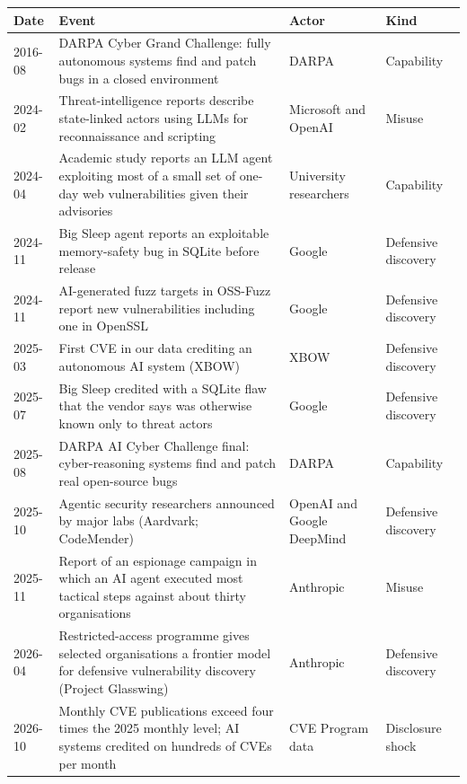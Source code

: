 \begin{tabular}{p{}p{}p{}p{}}
\toprule
Date & Event & Actor & Kind \\
\midrule
2016-08 & DARPA Cyber Grand Challenge: fully autonomous systems find and patch bugs in a closed environment & DARPA & Capability \\
2024-02 & Threat-intelligence reports describe state-linked actors using LLMs for reconnaissance and scripting & Microsoft and OpenAI & Misuse \\
2024-04 & Academic study reports an LLM agent exploiting most of a small set of one-day web vulnerabilities given their advisories & University researchers & Capability \\
2024-11 & Big Sleep agent reports an exploitable memory-safety bug in SQLite before release & Google & Defensive discovery \\
2024-11 & AI-generated fuzz targets in OSS-Fuzz report new vulnerabilities including one in OpenSSL & Google & Defensive discovery \\
2025-03 & First CVE in our data crediting an autonomous AI system (XBOW) & XBOW & Defensive discovery \\
2025-07 & Big Sleep credited with a SQLite flaw that the vendor says was otherwise known only to threat actors & Google & Defensive discovery \\
2025-08 & DARPA AI Cyber Challenge final: cyber-reasoning systems find and patch real open-source bugs & DARPA & Capability \\
2025-10 & Agentic security researchers announced by major labs (Aardvark; CodeMender) & OpenAI and Google DeepMind & Defensive discovery \\
2025-11 & Report of an espionage campaign in which an AI agent executed most tactical steps against about thirty organisations & Anthropic & Misuse \\
2026-04 & Restricted-access programme gives selected organisations a frontier model for defensive vulnerability discovery (Project Glasswing) & Anthropic & Defensive discovery \\
2026-10 & Monthly CVE publications exceed four times the 2025 monthly level; AI systems credited on hundreds of CVEs per month & CVE Program data & Disclosure shock \\
\bottomrule
\end{tabular}